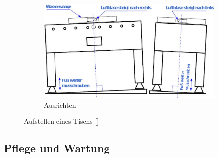 \begin{figure}
\begin{subfigure}[b]{0.7\textwidth}
        \end{subfigure} 
        \begin{subfigure}[b]{0.7\textwidth} 
            \includegraphics[width=\textwidth]{img/tisch_ausrichten.png} 
            \caption{Ausrichten} 
            \label{fig:tisch:ausrichten} 
        \end{subfigure} 
        \label{fig:tisch} 
        \caption{Aufstellen eines Tischs [\cite{itsf_basics}]} 
\end{figure}

\subsection{Pflege und Wartung}
\label{tisch:tisch:wartung}

